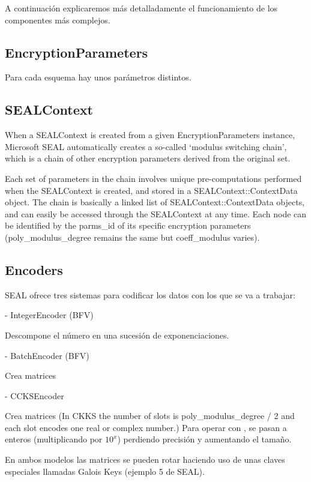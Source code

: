 A continuación explicaremos más detalladamente el funcionamiento de los componentes más complejos.

\subsection{EncryptionParameters}

Para cada esquema hay unos parámetros distintos.

\subsection{SEALContext}

When a SEALContext is created from a given EncryptionParameters instance,
Microsoft SEAL automatically creates a so-called `modulus switching chain',
which is a chain of other encryption parameters derived from the original set.

Each set of parameters in the chain involves unique pre-computations performed
when the SEALContext is created, and stored in a SEALContext::ContextData
object. The chain is basically a linked list of SEALContext::ContextData
objects, and can easily be accessed through the SEALContext at any time. Each
node can be identified by the parms_id of its specific encryption parameters
(poly_modulus_degree remains the same but coeff_modulus varies).

\subsection{Encoders}

SEAL ofrece tres sistemas para codificar los datos con los que se va a trabajar:

    - IntegerEncoder (BFV)

    Descompone el número en una sucesión de exponenciaciones.

    - BatchEncoder (BFV)

    Crea matrices

    - CCKSEncoder

    Crea matrices (In CKKS the number of slots is poly\_modulus\_degree / 2 and each slot encodes one real or complex number.) Para operar con , se pasan a enteros (multiplicando por $10^x$) perdiendo precisión y aumentando el tamaño.


    En ambos modelos las matrices se pueden rotar haciendo uso de unas claves especiales llamadas Galois Keys (ejemplo 5 de SEAL).

